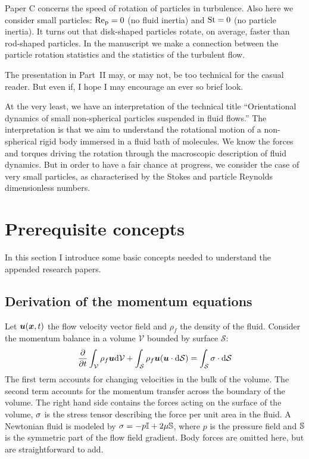 \documentclass[thesis.tex]{subfiles}
\begin{document}
Paper C concerns the speed of rotation of particles in turbulence. Also here we consider small particles: $\mbox{Re}_{\mathrm p}=0$ (no fluid inertia) and $\mbox{St}=0$ (no particle inertia). It turns out that disk-shaped particles rotate, on average, faster than rod-shaped particles. In the manuscript we make a connection between the particle rotation statistics and the statistics of the turbulent flow. 

The presentation in Part~II may, or may not, be too technical for the casual reader. But even if, I hope I may encourage an ever so brief look.

At the very least, we have an interpretation of the technical title ``Orientational dynamics of small non-spherical particles suspended in fluid flows.'' The interpretation is that we aim to understand the rotational motion of a non-spherical rigid body immersed in a fluid bath of molecules. We know the forces and torques driving the rotation through the macroscopic description of fluid dynamics. But in order to have a fair chance at progress, we consider the case of very small particles, as characterised by the Stokes and particle Reynolds dimensionless numbers.


\chapter{Prerequisite concepts}\label{sec:prerequisites}


In this section I introduce some basic concepts needed to understand the appended research papers. 

\section{Derivation of the momentum equations}

Let $\mbox{\boldmath$u$}(\mbox{\boldmath$x$}, t)$ the flow velocity vector field and $\rho_f$ the density of the fluid. Consider the momentum balance in a volume $\mathcal V$ bounded by surface $\mathcal S$:
\begin{align}
    \frac{\partial }{\partial t}\int_\mathcal V  \rho_f \mbox{\boldmath$u$} \mathrm{d}\mathcal V +
    \int_\mathcal S \rho_f\mbox{\boldmath$u$} (\mbox{\boldmath$u$} \cdot \mathrm{d} \mathcal S) =
    \int_\mathcal S \mathbb{\sigma} \cdot \mathrm{d} \mathcal S
\end{align}
The first term accounts for changing velocities in the bulk of the volume. The second term accounts for the momentum transfer across the boundary of the volume. The right hand side contains the forces acting on the surface of the volume, $\mathbb{\sigma}$ is the stress tensor describing the force per unit area in the fluid. A Newtonian fluid is modeled by $\mathbb{\sigma} = -p \mathbb{I} + 2\mu \mathbb{S}$, where $p$ is the pressure field and $\mathbb{S}$ is the symmetric part of the flow field gradient. Body forces are omitted here, but are straightforward to add.
\end{document}
